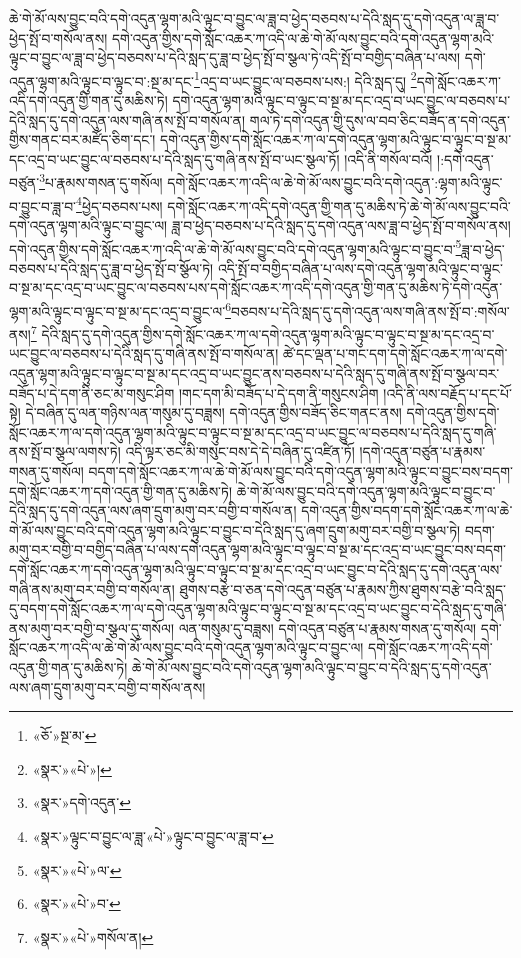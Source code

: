 ཆེ་གེ་མོ་ལས་བྱུང་བའི་དགེ་འདུན་ལྷག་མའི་ལྟུང་བ་བྱུང་ལ་ཟླ་བ་ཕྱེད་བཅབས་པ་དེའི་སླད་དུ་དགེ་འདུན་ལ་ཟླ་བ་ཕྱེད་སྤོ་བ་གསོལ་ནས། དགེ་འདུན་གྱིས་དགེ་སློང་འཆར་ཀ་འདི་ལ་ཆེ་གེ་མོ་ལས་བྱུང་བའི་དགེ་འདུན་ལྷག་མའི་ལྟུང་བ་བྱུང་ལ་ཟླ་བ་ཕྱེད་བཅབས་པ་དེའི་སླད་དུ་ཟླ་བ་ཕྱེད་སྤོ་བ་སྩལ་ཏེ་འདི་སྤོ་བ་བགྱིད་བཞིན་པ་ལས། དགེ་འདུན་ལྷག་མའི་ལྟུང་བ་ལྟུང་བ་:སྔ་མ་དང་\footnote{«ཅོ་»སྔ་མ་}འདྲ་བ་ཡང་བྱུང་ལ་བཅབས་པས:། དེའི་སླད་དུ། \footnote{«སྣར་»«པེ་»།  }དགེ་སློང་འཆར་ཀ་འདི་དགེ་འདུན་གྱི་གན་དུ་མཆིས་ཏེ། དགེ་འདུན་ལྷག་མའི་ལྟུང་བ་ལྟུང་བ་སྔ་མ་དང་འདྲ་བ་ཡང་བྱུང་ལ་བཅབས་པ་དེའི་སླད་དུ་དགེ་འདུན་ལས་གཞི་ནས་སྤོ་བ་གསོལ་ན། གལ་ཏེ་དགེ་འདུན་གྱི་དུས་ལ་བབ་ཅིང་བཟོད་ན་དགེ་འདུན་གྱིས་གནང་བར་མཛོད་ཅིག་དང་། དགེ་འདུན་གྱིས་དགེ་སློང་འཆར་ཀ་ལ་དགེ་འདུན་ལྷག་མའི་ལྟུང་བ་ལྟུང་བ་སྔ་མ་དང་འདྲ་བ་ཡང་བྱུང་ལ་བཅབས་པ་དེའི་སླད་དུ་གཞི་ནས་སྤོ་བ་ཡང་སྩལ་ཏོ། །འདི་ནི་གསོལ་བའོ། །:དགེ་འདུན་བཙུན་\footnote{«སྣར་»དགེ་འདུན་}པ་རྣམས་གསན་དུ་གསོལ། དགེ་སློང་འཆར་ཀ་འདི་ལ་ཆེ་གེ་མོ་ལས་བྱུང་བའི་དགེ་འདུན་:ལྷག་མའི་ལྟུང་བ་བྱུང་བ་ཟླ་བ་\footnote{«སྣར་»ལྟུང་བ་བྱུང་ལ་ཟླ་«པེ་»ལྟུང་བ་བྱུང་ལ་ཟླ་བ་}ཕྱེད་བཅབས་པས། དགེ་སློང་འཆར་ཀ་འདི་དགེ་འདུན་གྱི་གན་དུ་མཆིས་ཏེ་ཆེ་གེ་མོ་ལས་བྱུང་བའི་དགེ་འདུན་ལྷག་མའི་ལྟུང་བ་བྱུང་ལ། ཟླ་བ་ཕྱེད་བཅབས་པ་དེའི་སླད་དུ་དགེ་འདུན་ལས་ཟླ་བ་ཕྱེད་སྤོ་བ་གསོལ་ནས། དགེ་འདུན་གྱིས་དགེ་སློང་འཆར་ཀ་འདི་ལ་ཆེ་གེ་མོ་ལས་བྱུང་བའི་དགེ་འདུན་ལྷག་མའི་ལྟུང་བ་བྱུང་བ་\footnote{«སྣར་»«པེ་»ལ་}ཟླ་བ་ཕྱེད་བཅབས་པ་དེའི་སླད་དུ་ཟླ་བ་ཕྱེད་སྤོ་བ་སྩོལ་ཏེ། འདི་སྤོ་བ་བགྱིད་བཞིན་པ་ལས་དགེ་འདུན་ལྷག་མའི་ལྟུང་བ་ལྟུང་བ་སྔ་མ་དང་འདྲ་བ་ཡང་བྱུང་ལ་བཅབས་པས་དགེ་སློང་འཆར་ཀ་འདི་དགེ་འདུན་གྱི་གན་དུ་མཆིས་ཏེ་དགེ་འདུན་ལྷག་མའི་ལྟུང་བ་ལྟུང་བ་སྔ་མ་དང་འདྲ་བ་བྱུང་ལ་\footnote{«སྣར་»«པེ་»བ་}བཅབས་པ་དེའི་སླད་དུ་དགེ་འདུན་ལས་གཞི་ནས་སྤོ་བ་:གསོལ་ནས།\footnote{«སྣར་»«པེ་»གསོལ་ན།} དེའི་སླད་དུ་དགེ་འདུན་གྱིས་དགེ་སློང་འཆར་ཀ་ལ་དགེ་འདུན་ལྷག་མའི་ལྟུང་བ་ལྟུང་བ་སྔ་མ་དང་འདྲ་བ་ཡང་བྱུང་ལ་བཅབས་པ་དེའི་སླད་དུ་གཞི་ནས་སྤོ་བ་གསོལ་ན། ཚེ་དང་ལྡན་པ་གང་དག་དགེ་སློང་འཆར་ཀ་ལ་དགེ་འདུན་ལྷག་མའི་ལྟུང་བ་ལྟུང་བ་སྔ་མ་དང་འདྲ་བ་ཡང་བྱུང་ནས་བཅབས་པ་དེའི་སླད་དུ་གཞི་ནས་སྤོ་བ་སྩལ་བར་བཟོད་པ་དེ་དག་ནི་ཅང་མ་གསུང་ཤིག །གང་དག་མི་བཟོད་པ་དེ་དག་ནི་གསུངས་ཤིག །འདི་ནི་ལས་བརྗོད་པ་དང་པོ་སྟེ། དེ་བཞིན་དུ་ལན་གཉིས་ལན་གསུམ་དུ་བཟླས། དགེ་འདུན་གྱིས་བཟོད་ཅིང་གནང་ནས། དགེ་འདུན་གྱིས་དགེ་སློང་འཆར་ཀ་ལ་དགེ་འདུན་ལྷག་མའི་ལྟུང་བ་ལྟུང་བ་སྔ་མ་དང་འདྲ་བ་ཡང་བྱུང་ལ་བཅབས་པ་དེའི་སླད་དུ་གཞི་ནས་སྤོ་བ་སྩལ་ལགས་ཏེ། འདི་ལྟར་ཅང་མི་གསུང་བས་དེ་དེ་བཞིན་དུ་འཛིན་ཏོ། །དགེ་འདུན་བཙུན་པ་རྣམས་གསན་དུ་གསོལ། བདག་དགེ་སློང་འཆར་ཀ་ལ་ཆེ་གེ་མོ་ལས་བྱུང་བའི་དགེ་འདུན་ལྷག་མའི་ལྟུང་བ་བྱུང་བས་བདག་དགེ་སློང་འཆར་ཀ་དགེ་འདུན་གྱི་གན་དུ་མཆིས་ཏེ། ཆེ་གེ་མོ་ལས་བྱུང་བའི་དགེ་འདུན་ལྷག་མའི་ལྟུང་བ་བྱུང་བ་དེའི་སླད་དུ་དགེ་འདུན་ལས་ཞག་དྲུག་མགུ་བར་བགྱི་བ་གསོལ་ན། དགེ་འདུན་གྱིས་བདག་དགེ་སློང་འཆར་ཀ་ལ་ཆེ་གེ་མོ་ལས་བྱུང་བའི་དགེ་འདུན་ལྷག་མའི་ལྟུང་བ་བྱུང་བ་དེའི་སླད་དུ་ཞག་དྲུག་མགུ་བར་བགྱི་བ་སྩལ་ཏེ། བདག་མགུ་བར་བགྱི་བ་བགྱིད་བཞིན་པ་ལས་དགེ་འདུན་ལྷག་མའི་ལྟུང་བ་ལྟུང་བ་སྔ་མ་དང་འདྲ་བ་ཡང་བྱུང་བས་བདག་དགེ་སློང་འཆར་ཀ་དགེ་འདུན་ལྷག་མའི་ལྟུང་བ་ལྟུང་བ་སྔ་མ་དང་འདྲ་བ་ཡང་བྱུང་བ་དེའི་སླད་དུ་དགེ་འདུན་ལས་གཞི་ནས་མགུ་བར་བགྱི་བ་གསོལ་ན། ཐུགས་བརྩེ་བ་ཅན་དགེ་འདུན་བཙུན་པ་རྣམས་ཀྱིས་ཐུགས་བརྩེ་བའི་སླད་དུ་བདག་དགེ་སློང་འཆར་ཀ་ལ་དགེ་འདུན་ལྷག་མའི་ལྟུང་བ་ལྟུང་བ་སྔ་མ་དང་འདྲ་བ་ཡང་བྱུང་བ་དེའི་སླད་དུ་གཞི་ནས་མགུ་བར་བགྱི་བ་སྩལ་དུ་གསོལ། ལན་གསུམ་དུ་བཟླས། དགེ་འདུན་བཙུན་པ་རྣམས་གསན་དུ་གསོལ། དགེ་སློང་འཆར་ཀ་འདི་ལ་ཆེ་གེ་མོ་ལས་བྱུང་བའི་དགེ་འདུན་ལྷག་མའི་ལྟུང་བ་བྱུང་ལ། དགེ་སློང་འཆར་ཀ་འདི་དགེ་འདུན་གྱི་གན་དུ་མཆིས་ཏེ། ཆེ་གེ་མོ་ལས་བྱུང་བའི་དགེ་འདུན་ལྷག་མའི་ལྟུང་བ་བྱུང་བ་དེའི་སླད་དུ་དགེ་འདུན་ལས་ཞག་དྲུག་མགུ་བར་བགྱི་བ་གསོལ་ནས། 
